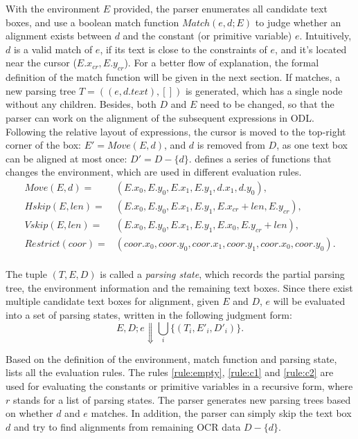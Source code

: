With the environment $E$ provided,
the parser enumerates all candidate text boxes,
and use a boolean match function $Match(e, d; E)$ to
judge whether an alignment exists between $d$ and
the constant (or primitive variable) $e$.
Intuitively, $d$ is a valid match of $e$,
if its text is close to the constraints of $e$,
and it's located near the cursor ($E.x_{cr}, E.y_{cr}$).
For a better flow of explanation, the formal definition of the match function
will be given in the next section.
If matches, a new parsing tree $T=((e, d.text), [])$ is generated,
which has a single node without any children.
Besides, both $D$ and $E$ need to be changed, so that the parser
can work on the alignment of the subsequent expressions in ODL.
Following the relative layout of expressions,
the cursor is moved to the top-right corner of the box:
$E' = Move(E, d)$, and $d$ is removed from $D$,
as one text box can be aligned at most once: $D' = D - \{d\}$.
 defines a series of functions
that changes the environment, which are used in different evaluation rules.
\begin{equation}
  \begin{aligned}
    Move(E, d) = & (E.x_0, E.y_0, E.x_1, E.y_1, d.x_1, d.y_0), \\
    Hskip(E, len) = & (E.x_0, E.y_0, E.x_1, E.y_1, E.x_{cr}+len, E.y_{cr}), \\
    Vskip(E, len) = & (E.x_0, E.y_0, E.x_1, E.y_1, E.x_0, E.y_{cr}+len), \\
    Restrict(coor) = & (coor.x_0, coor.y_0, coor.x_1, coor.y_1, coor.x_0, coor.y_0). \\
  \end{aligned}
  \label{equ:semantic-operations}
\end{equation}

The tuple $(T, E, D)$ is called a \textit{parsing state},
which records the partial parsing tree,
the environment information and the remaining text boxes.
Since there exist multiple candidate text boxes for alignment,
given $E$ and $D$, $e$ will be evaluated into a set of parsing states,
written in the following judgment form:
\begin{equation}
  E,D;e \Downarrow \bigcup_{i} \{(T_i, E'_i, D'_i)\}.
\end{equation}

Based on the definition of the environment, match function and parsing state,
 lists all the evaluation rules.
The rules \ref{rule:empty}, \ref{rule:c1} and \ref{rule:c2} are used for
evaluating the constants or primitive variables in a recursive form,
where $r$ stands for a list of parsing states.
The parser generates new parsing trees based on whether $d$ and $e$ matches.
In addition, the parser can simply skip the text box $d$ and try to find
alignments from remaining OCR data $D-\{d\}$.

